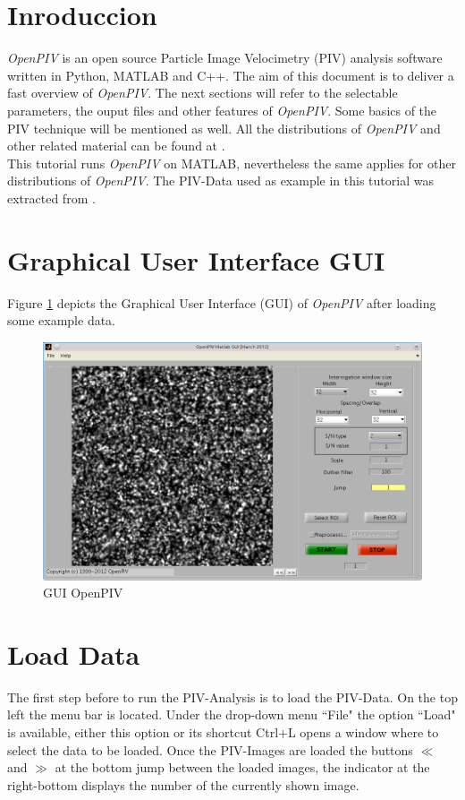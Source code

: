 \section{Inroduccion}\label{Intro}
\emph{OpenPIV} is an open source Particle Image Velocimetry (PIV) analysis software written in 
Python, MATLAB and C++. The aim of this document is to deliver a fast overview of \emph{OpenPIV}. 
The next sections will refer to the selectable parameters, the ouput files and other features 
of \emph{OpenPIV}. Some basics of the PIV technique will be mentioned as well. All the distributions 
of \emph{OpenPIV} and other related material can be found at \cite{Liberzon:2009,Taylor:2010}. \\ 

This tutorial runs \emph{OpenPIV} on MATLAB, nevertheless the same applies for other distributions 
of \emph{OpenPIV}. The PIV-Data used as example in this tutorial was extracted from 
\cite{carlier_2005}.

\section{Graphical User Interface GUI}\label{GUI}
Figure \ref{fig:GUI} depicts the Graphical User Interface (GUI) of \emph{OpenPIV} after loading 
some example data.

\begin{figure}[H]
	\centering
	\includegraphics[width=\textwidth]{Images/User_Interface.png}
	\caption{GUI OpenPIV}
	\label{fig:GUI}
\end{figure}

\section{Load Data}\label{Load}
The first step before to run the PIV-Analysis is to load the PIV-Data. On the top left the menu bar 
is located. Under the drop-down menu ``File" the option ``Load" is available, either this option or 
its shortcut Ctrl+L opens a window where to select the data to be loaded. Once the PIV-Images are 
loaded the buttons $\ll$ and $\gg$ at the bottom jump between the loaded images, the indicator at 
the right-bottom displays the number of the currently shown image. \\

